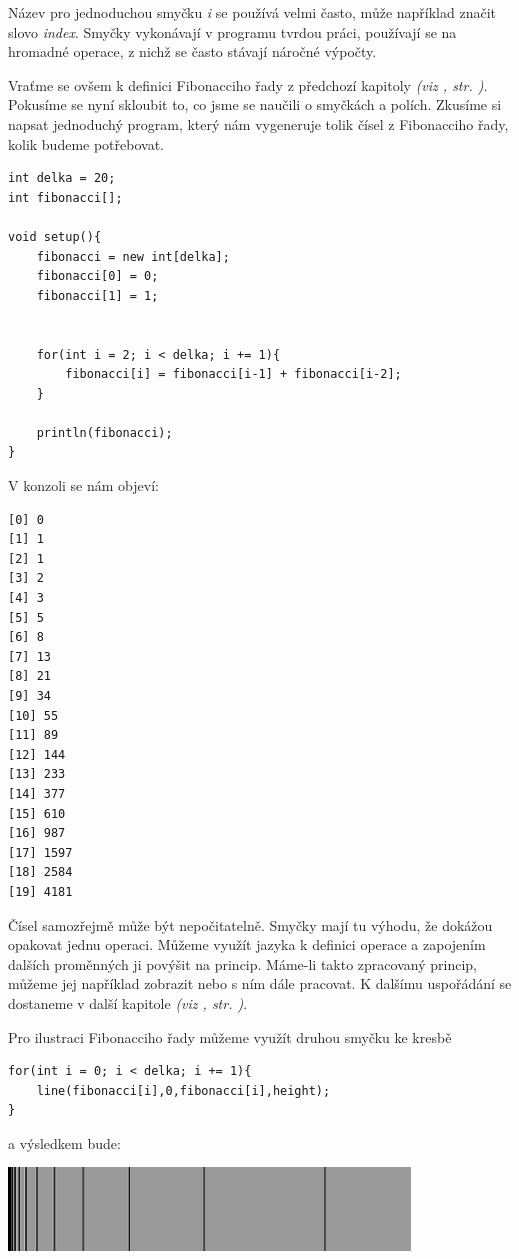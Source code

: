 \documentclass[10pt]{book}
\newcommand{\odkaz}[1]{\textit{(viz \nameref{#1}, str. \pageref*{#1})}}
\begin{document}
Název pro jednoduchou smyčku {\em i} se používá velmi často, může například značit slovo {\em index}. Smyčky vykonávají v programu tvrdou práci, používají se na hromadné operace, z nichž se často stávají náročné výpočty.

Vraťme se ovšem k definici Fibonacciho řady z předchozí kapitoly \odkaz{Pole}. Pokusíme se nyní skloubit to, co jsme se naučili o smyčkách a polích. Zkusíme si napsat jednoduchý program, který nám vygeneruje tolik čísel z Fibonacciho řady, kolik budeme potřebovat.


\begin{lstlisting}
int delka = 20;
int fibonacci[];

void setup(){
	fibonacci = new int[delka];
	fibonacci[0] = 0;
	fibonacci[1] = 1;
	
	
	for(int i = 2; i < delka; i += 1){
		fibonacci[i] = fibonacci[i-1] + fibonacci[i-2];
	}
	
	println(fibonacci);
}

\end{lstlisting}

V konzoli se nám objeví:

\begin{lstlisting}
[0] 0
[1] 1
[2] 1
[3] 2
[4] 3
[5] 5
[6] 8
[7] 13
[8] 21
[9] 34
[10] 55
[11] 89
[12] 144
[13] 233
[14] 377
[15] 610
[16] 987
[17] 1597
[18] 2584
[19] 4181
\end{lstlisting}

Čísel samozřejmě může být nepočitatelně. Smyčky mají tu výhodu, že dokážou opakovat jednu operaci. Můžeme využít jazyka k definici operace a zapojením dalších proměnných ji povýšit na princip. Máme-li takto zpracovaný princip, můžeme jej například zobrazit nebo s ním dále pracovat. K dalšímu uspořádání se dostaneme v další kapitole \odkaz{Funkce}.

Pro ilustraci Fibonacciho řady můžeme využít druhou smyčku ke kresbě

\begin{lstlisting}
for(int i = 0; i < delka; i += 1){
	line(fibonacci[i],0,fibonacci[i],height);
}
\end{lstlisting}

a výsledkem bude:

\begin{center}
\includegraphics[width = 0.8\textwidth]{imgs/smycka-1.png}
\end{center}
\end{document}
